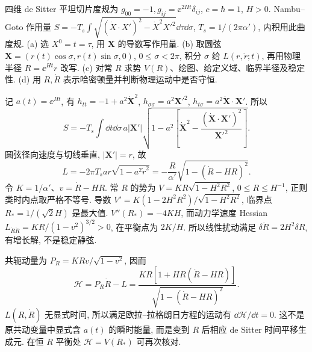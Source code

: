 \begin{exercise}
四维 de Sitter 平坦切片度规为
$g_{00}=-1,g_{ij}=\ee^{2Ht}\delta_{ij}$, $c=\hbar=1$, $H>0$.
Nambu--Goto 作用量 $S=-T_s\int\sqrt{(\dot X\cdot X')^2-\dot X^2X'^2}\dd\tau\dd\sigma$, $T_s=1/(2\pi\alpha')$, 内积用此曲度规.
(a) 选 $X^0=t=\tau$, 用 $\boldsymbol X$ 的导数写作用量.
(b) 取圆弦 $\boldsymbol X=(r(t)\cos\sigma,r(t)\sin\sigma,0)$, $0\leq\sigma<2\pi$, 积分 $\sigma$ 给 $L(r,\dot r;t)$, 再用物理半径 $R=\ee^{Ht}r$ 改写.
(c) 对常 $R$ 求势 $V(R)$、绘图、给定义域、临界半径及稳定性.
(d) 用 $R,\dot R$ 表示哈密顿量并判断物理运动中是否守恒.
\end{exercise}
\begin{solution}
记 $a(t)=\ee^{Ht}$, 有
$h_{tt}=-1+a^2\dot{\boldsymbol X}^2$,
$h_{\sigma\sigma}=a^2\boldsymbol X'^2$,
$h_{t\sigma}=a^2\dot{\boldsymbol X}\cdot\boldsymbol X'$. 所以
\[
 S=-T_s\int\dd t\dd\sigma\,
 a|\boldsymbol X'|
 \sqrt{1-a^2\left[\dot{\boldsymbol X}^2-
 \frac{(\dot{\boldsymbol X}\cdot\boldsymbol X')^2}{\boldsymbol X'^2}\right]}.
\]
圆弦径向速度与切线垂直, $|\boldsymbol X'|=r$, 故
\[
 L=-2\pi T_s a r\sqrt{1-a^2\dot r^2}
 =-\frac{R}{\alpha'}\sqrt{1-(\dot R-HR)^2}.
\]
令 $K=1/\alpha'$、$v=\dot R-HR$. 常 $R$ 的势为
$V=KR\sqrt{1-H^2R^2}$, $0\leq R\leq H^{-1}$, 正则类时内点取严格不等号. 导数
$V'=K(1-2H^2R^2)/\sqrt{1-H^2R^2}$, 临界点 $R_*=1/(\sqrt2H)$ 是最大值. $V''(R_*)=-4KH$, 而动力学速度 Hessian $L_{\dot R\dot R}=KR/(1-v^2)^{3/2}>0$, 在平衡点为 $2K/H$.
所以线性扰动满足 $\delta\ddot R=2H^2\delta R$, 有增长解, 不是稳定静弦.

\begin{center}
\end{center}

共轭动量为 $P_R=KRv/\sqrt{1-v^2}$, 因而
\[
 \mathcal H=P_R\dot R-L
 =\frac{KR[1+HR(\dot R-HR)]}{\sqrt{1-(\dot R-HR)^2}}.
\]
$L(R,\dot R)$ 无显式时间, 所以满足欧拉--拉格朗日方程的运动有 $\dd\mathcal H/\dd t=0$. 这不是原共动变量中显式含 $a(t)$ 的瞬时能量, 而是变到 $R$ 后相应 de Sitter 时间平移生成元. 在恒 $R$ 平衡处 $\mathcal H=V(R_*)$ 可再次核对.
\end{solution}

